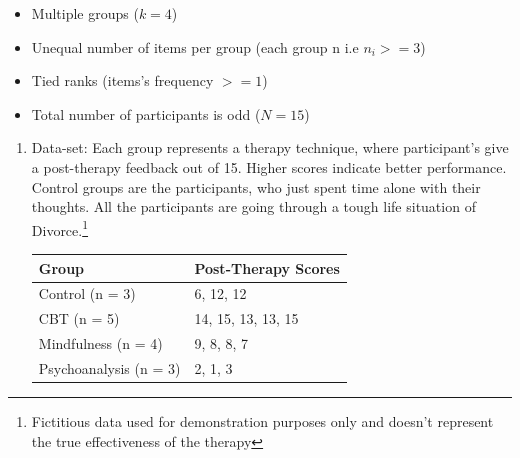 \documentclass[a4paper,fleqn,review]{cas-sc}
\begin{document}
\begin{itemize}
	\item Multiple groups ($k = 4$)
	\item Unequal number of items per group (each group n i.e $n_i >= 3$)
	\item Tied ranks (items's frequency $>=1$)
	\item Total number of participants is odd ($N = 15$)
\end{itemize}
\begin{enumerate}[Step 1.]
	\item Data-set: Each group represents a therapy technique, where participant's give a post-therapy feedback out of 15. Higher scores indicate better performance. Control groups are the participants, who just spent time alone with their thoughts. All the participants are going through a tough life situation of Divorce.\footnote{Fictitious data used for demonstration purposes only and doesn't represent the true effectiveness of the therapy}
	\begin{center}
		\begin{tabular}{|l|l|}
			\hline
			\textbf{Group} & \textbf{Post-Therapy Scores} \\
			\hline
			Control (n = 3) & 6, 12, 12 \\
			CBT (n = 5) & 14, 15, 13, 13, 15 \\
			Mindfulness (n = 4) & 9, 8, 8, 7 \\
			Psychoanalysis (n = 3) & 2, 1, 3 \\
			\hline
		\end{tabular}
	\end{center}
	

\end{enumerate}
\end{document}
